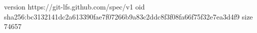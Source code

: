 version https://git-lfs.github.com/spec/v1
oid sha256:bc3132141dc2a613390fae7f07266b9a83c2ddc8f3f08fa66f75f32e7ea3d4f9
size 74657
